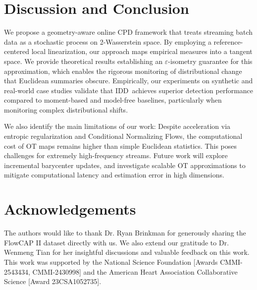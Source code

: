 \documentclass{article}
\newcommand{\algoname}{\textsc{IDD}\xspace}
\newcommand{\rev}[1]{\textcolor{black}{#1}}
\theoremstyle{plain}
\theoremstyle{definition}
\theoremstyle{remark}
\begin{document}
\section{Discussion and Conclusion}
We propose a geometry-aware online CPD framework that treats streaming batch data as a stochastic process on 2-Wasserstein space. 
By employing a reference-centered local linearization, our approach maps empirical measures into a tangent space. 
We provide theoretical results establishing an $\varepsilon$-isometry guarantee for this approximation, which enables the rigorous monitoring of distributional change  that Euclidean summaries obscure.
 Empirically, our experiments on synthetic and real-world case studies validate that \algoname\ achieves superior detection performance compared to moment-based and model-free baselines, particularly when monitoring complex distributional shifts.

We also identify the main limitations of our work: Despite acceleration via entropic regularization  and Conditional Normalizing Flows, the computational cost of OT maps remains higher than simple Euclidean statistics.
This poses challenges for extremely high-frequency streams.
Future work will explore incremental barycenter updates, and investigate scalable OT approximations to  mitigate computational latency and estimation error in high dimensions.


\section*{Acknowledgements}
The authors would like to thank Dr. Ryan Brinkman for generously sharing the FlowCAP II dataset directly with us. We also extend our gratitude to Dr. Wenmeng Tian for her insightful discussions and valuable feedback on this work.
This work was supported by the National Science Foundation [Awards CMMI-2543434, CMMI-2430998] and the American Heart Association Collaborative Science [Award 23CSA1052735].



\end{document}

